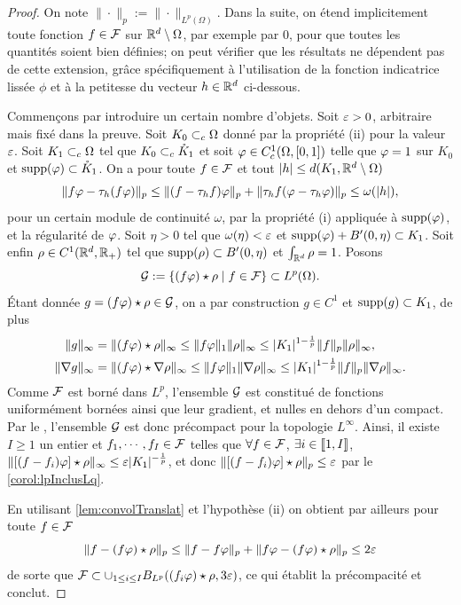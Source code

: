\begin{proof}
On note $\|\cdot\|_p := \|\cdot\|_{L^p(\Omega)}$.
Dans la suite, on étend implicitement toute fonction $f \in \mathcal{F}$ sur $\mathbb{R}^d\setminus \Omega$, par exemple par $0$, pour que toutes les quantités soient bien définies; on peut vérifier que les résultats ne dépendent pas de cette extension, grâce spécifiquement à l'utilisation de la fonction indicatrice lissée $\phi$ et à la petitesse du vecteur $h\in \mathbb{R}^d$ ci-dessous.

	Commençons par introduire un certain nombre d'objets.
	Soit $\varepsilon>0$, arbitraire mais fixé dans la preuve.
	Soit $K_0 \subset_c \Omega$ donné par la propriété (ii) pour la valeur $\varepsilon$. 
	Soit $K_1 \subset_c \Omega$ tel que $K_0 \subset_c \mathring K_1$ et soit $\varphi \in C^1_c(\Omega,[0,1])$ telle que $\varphi=1$ sur $K_0$ et $\operatorname{supp}(\varphi) \subset \mathring K_1$.
	On a pour toute $f \in \mathcal{F}$ et tout $|h| \leq d(K_1, \mathbb{R}^d \setminus \Omega)$
	\begin{equation}
	\label{eq:fphfp}
		\|f\varphi - \tau_h(f\varphi)\|_p \leq \|(f-\tau_h f)\varphi\|_p + \|\tau_h f(\varphi-\tau_h\varphi)\|_p \leq \omega(|h|),
	\end{equation}
	pour un certain module de continuité $\omega$, par la propriété (i) appliquée à $\operatorname{supp}(\varphi)$, et la régularité de $\varphi$.
	Soit $\eta>0$ tel que $\omega(\eta)<\varepsilon$ et $\operatorname{supp}(\varphi) + B'(0,\eta) \subset K_1$.
	Soit enfin $\rho \in C^1(\mathbb{R}^d,\mathbb{R}_+)$ tel que $\operatorname{supp}(\rho) \subset B'(0,\eta)$ et $\int_{\mathbb{R}^d} \rho=1$. 
	Posons 
	\begin{equation*}
		\mathcal{G} := \{(f \varphi) \star \rho  \mid f \in \mathcal{F}\} \subset L^p(\Omega).
	\end{equation*}
	Étant donnée $g = (f\varphi) \star \rho \in \mathcal{G}$, on a par construction $g \in C^1$ et $\operatorname{supp}(g) \subset K_1$, de plus
	\begin{align*}
		\|g\|_\infty &= \|(f\varphi) \star\rho\|_\infty \leq \|f \varphi\|_1 \|\rho\|_\infty \leq |K_1|^{1-\frac 1 p} \|f\|_p \|\rho \|_\infty,\\
		\|\nabla g\|_\infty &= \| (f\varphi) \star \nabla \rho\|_\infty \leq \|f\varphi\|_1 \|\nabla \rho\|_\infty \leq |K_1|^{1-\frac 1 p} \|f\|_p \|\nabla \rho\|_\infty.
	\end{align*}
	Comme $\mathcal{F}$ est borné dans $L^p$, l'ensemble $\mathcal{G}$ est constitué de fonctions uniformément bornées ainsi que leur gradient, et nulles en dehors d'un compact. Par le , l'ensemble $\mathcal{G}$ est donc précompact pour la topologie $L^\infty$. 
	Ainsi, il existe $I \geq 1$ un entier et $f_1, \cdots, f_I \in \mathcal{F}$ telles que $\forall f \in \mathcal{F}$, $\exists i\in {\left\llbracket 1,I \right\rrbracket}$, $\|[(f-f_i)\varphi] \star \rho \|_\infty \leq \varepsilon |K_1|^{-\frac 1 p}$, 
	 et donc $\|[(f-f_i)\varphi] \star \rho \|_p\leq \varepsilon$ par le \cref{corol:lpInclusLq}. 
	 
	En utilisant \cref{lem:convolTranslat} et l'hypothèse (ii) on obtient par ailleurs pour toute $f \in \mathcal{F}$
	\begin{equation*}
		\|f-(f\varphi)\star \rho\|_p \leq \|f-f\varphi\|_p + \|f\varphi - (f\varphi) \star\rho\|_p \leq 2 \varepsilon
	\end{equation*}
	de sorte que $\mathcal{F} \subset \cup_{1 \leq i \leq I} B_{L^p} ((f_i\varphi)\star \rho,3 \varepsilon)$, ce qui établit la précompacité et conclut.
\end{proof}

